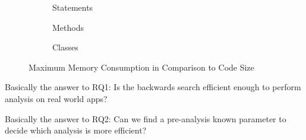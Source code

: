 \documentclass[../draft.tex]{subfiles}
\begin{document}
    \begin{figure}
        \centering
        \begin{subfigure}[b]{\textwidth}
            \centering
            \begin{subfigure}[]{0.45\textwidth}
                \centering
                \resizebox{\columnwidth}{!}{
                    
                }
            \end{subfigure}
            \qquad
            \begin{subfigure}[]{0.45\textwidth}
                \centering
                \resizebox{\columnwidth}{!}{
                    
                }
            \end{subfigure}
            \caption{Statements}
        \end{subfigure}
        \bigbreak
        \begin{subfigure}[b]{\textwidth}
            \centering
            \begin{subfigure}[]{0.45\textwidth}
                \centering
                \resizebox{\columnwidth}{!}{
                    
                }
            \end{subfigure}
            \qquad
            \begin{subfigure}[]{0.45\textwidth}
                \centering
                \resizebox{\columnwidth}{!}{
                    
                }
            \end{subfigure}
            \caption{Methods}
        \end{subfigure}
        \bigbreak
        \begin{subfigure}[b]{\textwidth}
            \centering
            \begin{subfigure}[]{0.45\textwidth}
                \centering
                \resizebox{\columnwidth}{!}{
                    
                }
            \end{subfigure}
            \qquad
            \begin{subfigure}[]{0.45\textwidth}
                \centering
                \resizebox{\columnwidth}{!}{
                    
                }
            \end{subfigure}
            \caption{Classes}
        \end{subfigure}
        \caption{Maximum Memory Consumption in Comparison to Code Size}
        \label{f:maxmemtocodesize}
    \end{figure}
    
    Basically the answer to RQ1: Is the backwards search efficient enough to perform analysis on real world apps?


    Basically the answer to RQ2: Can we find a pre-analysis known parameter to decide which analysis is more efficient?
\end{document}
